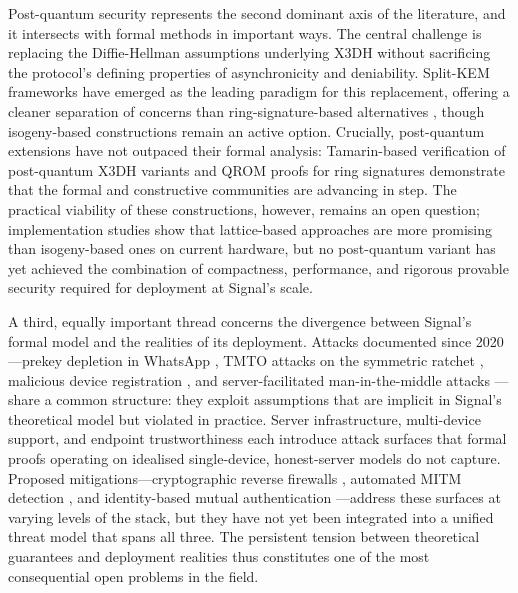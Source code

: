 Post-quantum security represents the second dominant axis of the literature, and it intersects with formal methods in important ways. The central challenge is replacing the Diffie-Hellman assumptions underlying X3DH without sacrificing the protocol's defining properties of asynchronicity and deniability. Split-KEM frameworks \parencite{brendel2021,collins2024b,niot2025} have emerged as the leading paradigm for this replacement, offering a cleaner separation of concerns than ring-signature-based alternatives \parencite{hashimoto2021,hashimoto2022,brendel2022}, though isogeny-based constructions \parencite{dobson2022,jankowski2025} remain an active option. Crucially, post-quantum extensions have not outpaced their formal analysis: Tamarin-based verification of post-quantum X3DH variants \parencite{beguinet2024} and QROM proofs for ring signatures \parencite{beckmann2026} demonstrate that the formal and constructive communities are advancing in step. The practical viability of these constructions, however, remains an open question; implementation studies \parencite{angom2025,jankowski2025} show that lattice-based approaches are more promising than isogeny-based ones on current hardware, but no post-quantum variant has yet achieved the combination of compactness, performance, and rigorous provable security required for deployment at Signal's scale.

A third, equally important thread concerns the divergence between Signal's formal model and the realities of its deployment. Attacks documented since 2020—prekey depletion in WhatsApp \parencite{gegenhuber2025}, TMTO attacks on the symmetric ratchet \parencite{mattsson2023}, malicious device registration \parencite{wichelmann2021}, and server-facilitated man-in-the-middle attacks \parencite{liu2022}—share a common structure: they exploit assumptions that are implicit in Signal's theoretical model but violated in practice. Server infrastructure, multi-device support, and endpoint trustworthiness each introduce attack surfaces that formal proofs operating on idealised single-device, honest-server models do not capture. Proposed mitigations—cryptographic reverse firewalls \parencite{dodis2025}, automated MITM detection \parencite{teng2024}, and identity-based mutual authentication \parencite{liu2022}—address these surfaces at varying levels of the stack, but they have not yet been integrated into a unified threat model that spans all three. The persistent tension between theoretical guarantees and deployment realities thus constitutes one of the most consequential open problems in the field.

